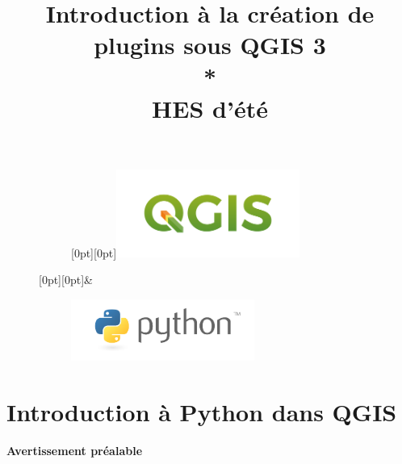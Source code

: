 \documentclass[11pt]{article}
\title{
\vspace{-0mm}\Huge{Introduction à la création de plugins sous QGIS 3}\\ 
\vspace*{0.64em}
*\quad*\quad*  \\
\vspace*{0.64em}
\LARGE{HES d'été }
}
\begin{document}
\clearpage
\maketitle

\begin{center}
\begin{figure}[H]
    \centering
    \begin{subfigure}[t]{0.44\textwidth}
    	\centering		
        \raisebox{-8pt}[0pt][0pt]{\includegraphics[width=6cm]{qgis-logo_anita02.png}}
    \end{subfigure}%
    \raisebox{24pt}[0pt][0pt]{\Huge\&\normalsize}
    \begin{subfigure}[t]{0.44\textwidth}
        \centering
        \includegraphics[width=6cm]{python-logo-master-v3-TM-flattened.png}
    \end{subfigure}
\end{figure}
\end{center}
\thispagestyle{empty}

\clearpage %
\begingroup
  \thispagestyle{empty}
  \null
  \newpage
\endgroup

\vspace*{-4.4em}
\tableofcontents
\vspace*{-1.2em}
\listoffigures
\vspace*{-1.2em}
\listoftables



\newpage{}

\pagestyle{fancy}

\section{Introduction à Python dans QGIS}
\label{Introduction}
\textbf{Avertissement préalable}\\\vspace*{-0.4em}
\end{document}
